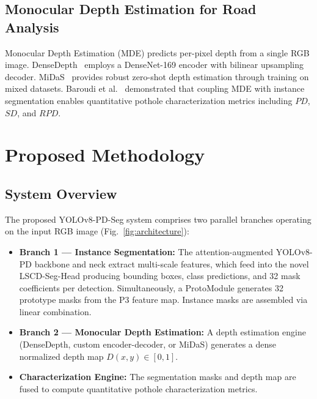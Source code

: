 \documentclass[conference]{IEEEtran}
\begin{document}
\subsection{Monocular Depth Estimation for Road Analysis}
Monocular Depth Estimation (MDE) predicts per-pixel depth from a single RGB image. DenseDepth~\cite{alhashim2018densedepth} employs a DenseNet-169 encoder with bilinear upsampling decoder. MiDaS~\cite{ranftl2020midas} provides robust zero-shot depth estimation through training on mixed datasets. Baroudi et al.~\cite{baroudi2025pothole} demonstrated that coupling MDE with instance segmentation enables quantitative pothole characterization metrics including $PD$, $SD$, and $RPD$.


\section{Proposed Methodology}
\label{sec:methodology}

\subsection{System Overview}
The proposed YOLOv8-PD-Seg system comprises two parallel branches operating on the input RGB image (Fig.~\ref{fig:architecture}):
\begin{itemize}[leftmargin=*]
    \item \textbf{Branch 1 --- Instance Segmentation:} The attention-augmented YOLOv8-PD backbone and neck extract multi-scale features, which feed into the novel LSCD-Seg-Head producing bounding boxes, class predictions, and 32 mask coefficients per detection. Simultaneously, a ProtoModule generates 32 prototype masks from the P3 feature map. Instance masks are assembled via linear combination.
    \item \textbf{Branch 2 --- Monocular Depth Estimation:} A depth estimation engine (DenseDepth, custom encoder-decoder, or MiDaS) generates a dense normalized depth map $D(x,y) \in [0,1]$.
    \item \textbf{Characterization Engine:} The segmentation masks and depth map are fused to compute quantitative pothole characterization metrics.
\end{itemize}
\end{document}
